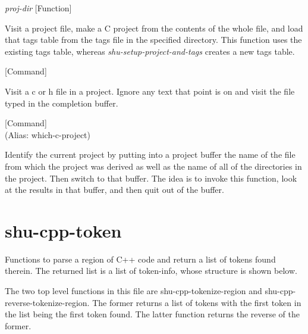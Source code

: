 \vspace{1em}
\noindent
{}
\usebox{\funcname}\emph{proj-dir}
 \hfill [Function]

\begin{doc-string}
Visit a project file, make a C project from the contents of the whole file,
and load that tags table from the tags file in the specified directory.  This
function uses the existing tags table, whereas \emph{shu-setup-project-and-tags}
creates a new tags table.
\end{doc-string}

\vspace{1em}
\noindent
{}
\usebox{\funcname}
 \hfill [Command]

\begin{doc-string}
Visit a c or h file in a project.  Ignore any text that point is on and visit the
file typed in the completion buffer.
\end{doc-string}

\vspace{1em}
\noindent
{}
\usebox{\funcname}
 \hfill [Command]\\%
 (Alias: which-c-project)

\begin{doc-string}
Identify the current project by putting into a project buffer the name of the file
from which the project was derived as well as the name of all of the directories in the
project.  Then switch to that buffer.  The idea is to invoke this function, look at the
results in that buffer, and then quit out of the buffer.
\end{doc-string}

\eject
\section{shu-cpp-token}


Functions to parse a region of C++ code and return a list of tokens
found therein.  The returned list is a list of token-info, whose structure
is shown below.

The two top level functions in this file are shu-cpp-tokenize-region and
shu-cpp-reverse-tokenize-region.  The former returns a list of tokens with the
first token in the list being the first token found.  The latter function
returns the reverse of the former.

